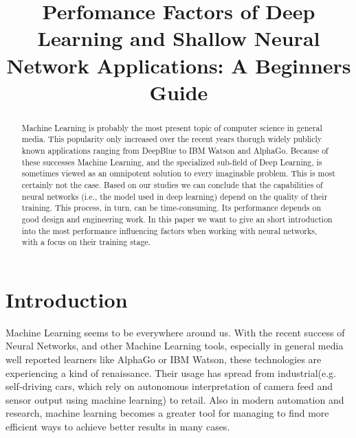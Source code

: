 \documentclass[conference]{IEEEtran}
\begin{document}
\title{
Perfomance Factors of Deep Learning and Shallow Neural Network Applications: A Beginners Guide
}

\author{
}

\maketitle

\begin{abstract}

Machine Learning is probably the most present topic of computer science in general media. This popularity only increased over the recent years thorugh widely publicly known applications ranging from DeepBlue to IBM Watson and AlphaGo. Because of these successes Machine Learning, and the specialized sub-field of Deep Learning,  is sometimes viewed as an omnipotent solution to every imaginable problem. This is most certainly not the case. Based on our studies we can conclude that the capabilities of neural networks (i.e., the model used in deep learning) depend on the quality of their training. This process, in turn, can be time-consuming. Its performance depends on good design and engineering work. In this paper we want to give an short introduction into the most performance influencing factors when working with neural networks, with a focus on their training stage.
\end{abstract}

\IEEEpeerreviewmaketitle
\section{Introduction}
Machine Learning seems to be everywhere around us. With the recent success of Neural Networks, and other Machine Learning tools, especially  in general media well reported learners like AlphaGo or IBM Watson, these technologies are experiencing a kind of renaissance. Their usage has spread from industrial(e.g. self-driving cars, which rely on autonomous interpretation of camera feed and sensor output using machine learning) to retail. Also in modern automation and research, machine learning becomes a greater tool for managing to find more efficient ways to achieve better results in many cases.
\end{document}
